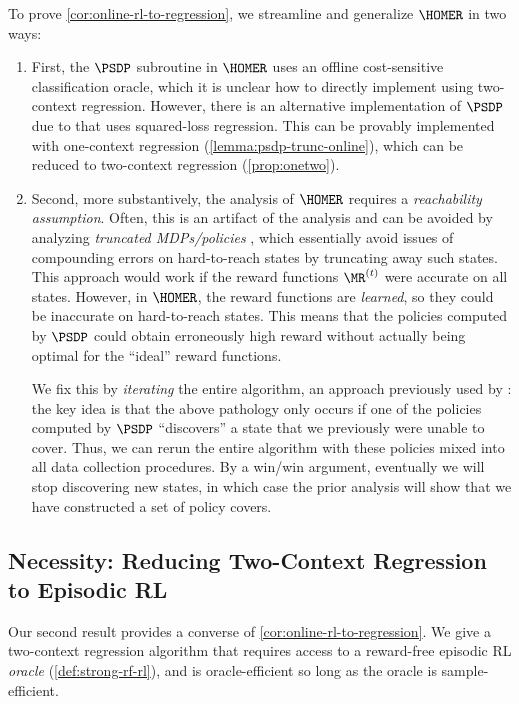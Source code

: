 To prove \cref{cor:online-rl-to-regression}, we streamline and generalize $\HOMER$ in two ways:
\begin{enumerate}
\item First, the $\PSDP$ subroutine in $\HOMER$ uses an offline cost-sensitive classification oracle, which it is unclear how to directly implement using two-context regression. However, there is an alternative implementation of $\PSDP$ due to \cite{mhammedi2023representation} that uses squared-loss regression. This can be provably implemented with one-context regression (\cref{lemma:psdp-trunc-online}), which can be reduced to two-context regression (\cref{prop:onetwo}).

\item Second, more substantively, the analysis of $\HOMER$ requires a \emph{reachability assumption}. Often, this is an artifact of the analysis and can be avoided by analyzing \emph{truncated MDPs/policies} \citep{golowich2022learning,mhammedi2023efficient}, which essentially avoid issues of compounding errors on hard-to-reach states by truncating away such states. This approach would work if the reward functions $\MR^{(t)}$ were accurate on all states. However, in $\HOMER$, the reward functions are \emph{learned}, so they could be inaccurate on hard-to-reach states. This means that the policies computed by $\PSDP$ could obtain erroneously high reward without actually being optimal for the ``ideal'' reward functions.

We fix this by \emph{iterating} the entire algorithm, an approach previously used by \cite{golowich2024exploring}: the key idea is that the above pathology only occurs if one of the policies computed by $\PSDP$ ``discovers'' a state that we previously were unable to cover. Thus, we can rerun the entire algorithm with these policies mixed into all data collection procedures. By a win/win argument, eventually we will stop discovering new states, in which case the prior analysis will show that we have constructed a set of policy covers.
\end{enumerate}

\fi 


\subsection{Necessity: Reducing Two-Context Regression to Episodic RL}\label{sec:episodic-nec}

Our second result provides a converse of \cref{cor:online-rl-to-regression}. We give a two-context regression algorithm that requires access to a reward-free episodic RL \emph{oracle} (\cref{def:strong-rf-rl}), and is oracle-efficient so long as the oracle is sample-efficient.\loose

